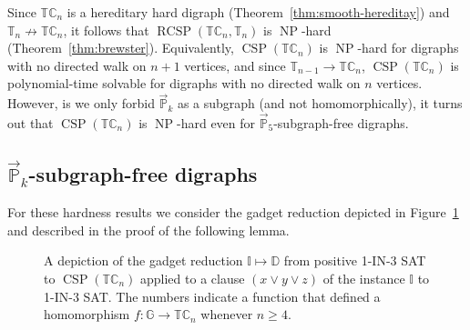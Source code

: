 \documentclass{article}
\theoremstyle{definition}
\theoremstyle{remark}
\DeclareMathOperator{\NP}{NP}
\DeclareMathOperator{\CSP}{CSP}
\DeclareMathOperator{\RCSP}{RCSP}
\newcommand{\bC}{{\mathbb C}}
\newcommand{\bD}{{\mathbb D}}
\newcommand{\bG}{{\mathbb G}}
\newcommand{\bI}{{\mathbb I}}
\newcommand{\bP}{{\mathbb P}}
\newcommand{\bT}{{\mathbb T}}
\begin{document}
Since $\bT\bC_n$ is a hereditary hard digraph (Theorem~\ref{thm:smooth-hereditay}) and $\bT_n\not\to \bT\bC_n$,
it follows that $\RCSP(\bT\bC_n,\bT_n)$ is $\NP$-hard (Theorem~\ref{thm:brewster}). Equivalently, $\CSP(\bT\bC_n)$ is
$\NP$-hard for digraphs with no directed walk on $n+1$ vertices, and since $\bT_{n-1}\to \bT\bC_n$, $\CSP(\bT\bC_n)$
is polynomial-time solvable for digraphs with no directed walk on $n$ vertices. However, is we only forbid
$\vec{\bP}_k$ as a subgraph (and not homomorphically), it turns out 
that $\CSP(\bT\bC_n)$ is $\NP$-hard even for $\vec{\bP}_5$-subgraph-free digraphs.



\subsection{$\vec{\bP}_k$-subgraph-free digraphs}



For these hardness results we consider the gadget reduction depicted in Figure~\ref{fig:gen-pp-def} and described in
the proof of the following lemma. 

\begin{figure}[ht!]
\centering
{}
\caption{
A depiction of the gadget reduction $\bI\mapsto \bD$ from positive 1-IN-3 SAT to
$\CSP(\bT\bC_n)$  applied to a clause $(x\lor y \lor z)$ of the instance $\bI$ to
1-IN-3 SAT. The numbers indicate a function that defined a homomorphism 
$f\colon \bG\to \bT\bC_n$ whenever $n\ge 4$.}
\label{fig:gen-pp-def}
\end{figure}
\end{document}
